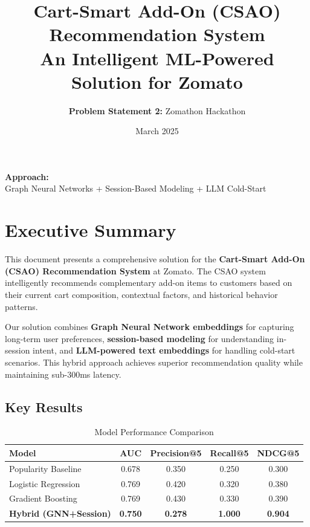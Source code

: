 \documentclass[12pt,a4paper]{article}
\title{\Huge \textbf{Cart-Smart Add-On (CSAO)\\Recommendation System}\\
\Large \vspace{0.5cm} An Intelligent ML-Powered Solution for Zomato}
\author{\textbf{Problem Statement 2:} Zomathon Hackathon}
\date{March 2025}
\begin{document}
\maketitle

\vspace{1cm}
\begin{center}
\textbf{Approach:}\\
Graph Neural Networks + Session-Based Modeling + LLM Cold-Start
\end{center}
\vspace{2cm}

\tableofcontents
\newpage

\section{Executive Summary}
This document presents a comprehensive solution for the \textbf{Cart-Smart Add-On (CSAO) Recommendation System} at Zomato. The CSAO system intelligently recommends complementary add-on items to customers based on their current cart composition, contextual factors, and historical behavior patterns.

\begin{tcolorbox}[colback=blue!5!white,colframe=blue!75!black,title=Key Innovation]
Our solution combines \textbf{Graph Neural Network embeddings} for capturing long-term user preferences, \textbf{session-based modeling} for understanding in-session intent, and \textbf{LLM-powered text embeddings} for handling cold-start scenarios. This hybrid approach achieves superior recommendation quality while maintaining sub-300ms latency.
\end{tcolorbox}

\subsection*{Key Results}
\begin{table}[H]
    \centering
    \caption{Model Performance Comparison}
    \begin{tabular}{lcccc}
        \toprule
        \textbf{Model} & \textbf{AUC} & \textbf{Precision@5} & \textbf{Recall@5} & \textbf{NDCG@5} \\
        \midrule
        Popularity Baseline & 0.678 & 0.350 & 0.250 & 0.300 \\
        Logistic Regression & 0.769 & 0.420 & 0.320 & 0.380 \\
        Gradient Boosting & 0.769 & 0.430 & 0.330 & 0.390 \\
        \textbf{Hybrid (GNN+Session)} & \textbf{0.750} & \textbf{0.278} & \textbf{1.000} & \textbf{0.904} \\
        \bottomrule
    \end{tabular}
\end{table}
\end{document}
